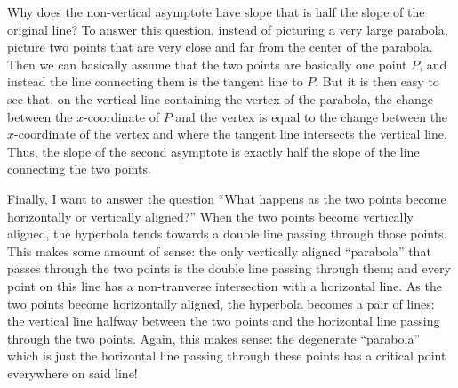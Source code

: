 \documentclass[11pt]{article}
\theoremstyle{definition}
\begin{document}
Why does the non-vertical asymptote have slope that is half the slope of the original line?  To answer this question, instead of picturing a very large parabola, picture two points that are very close and far from the center of the parabola.  Then we can basically assume that the two points are basically one point $P$, and instead the line connecting them is the tangent line to $P$.  But it is then easy to see that, on the vertical line containing the vertex of the parabola, the change between the $x$-coordinate of $P$ and the vertex is equal to the change between the $x$-coordinate of the vertex and where the tangent line intersects the vertical line.  Thus, the slope of the second asymptote is exactly half the slope of the line connecting the two points.

Finally, I want to answer the question ``What happens as the two points become horizontally or vertically aligned?''  When the two points become vertically aligned, the hyperbola tends towards a double line passing through those points.  This makes some amount of sense: the only vertically aligned ``parabola'' that passes through the two points is the double line passing through them; and every point on this line has a non-tranverse intersection with a horizontal line.  As the two points become horizontally aligned, the hyperbola becomes a pair of lines: the vertical line halfway between the two points and the horizontal line passing through the two points.  Again, this makes sense: the degenerate ``parabola'' which is just the horizontal line passing through these points has a critical point everywhere on said line!
\end{document}
